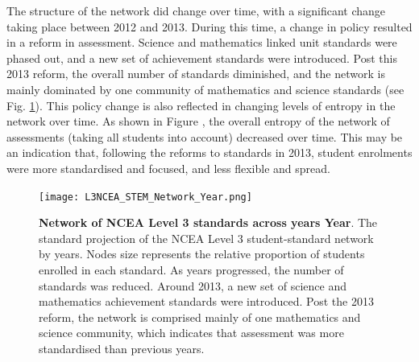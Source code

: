 The structure of the network did change over time, with a significant change taking place between 2012 and 2013. During this time, a change in policy resulted in a reform in assessment. Science and mathematics linked unit standards were phased out, and a new set of achievement standards were introduced. Post this 2013 reform, the overall number of standards diminished, and the network is mainly dominated by one community of mathematics and science standards (see Fig. \ref{fig:NetworkYear}). This policy change is also reflected in changing levels of entropy in the network over time. As shown in Figure , the overall entropy of the network of assessments (taking all students into account) decreased over time. This may be an indication that, following the reforms to standards in 2013, student enrolments were more standardised and focused, and less flexible and spread.


\begin{landscape}
\begin{figure}[h]
    \centering
    \texttt{[image: L3NCEA\_STEM\_Network\_Year.png]}
    \caption{\textbf{Network of NCEA Level 3 standards across years Year}. The standard projection of the NCEA Level 3 student-standard network by years. Nodes size represents the relative proportion of students enrolled in each standard. As years progressed, the number of standards was reduced. Around 2013, a new set of science and mathematics achievement standards were introduced. Post the 2013 reform, the network is comprised mainly of one mathematics and science community, which indicates that assessment was more standardised than previous years.
    }
    
    \label{fig:NetworkYear}
\end{figure}
\end{landscape}

